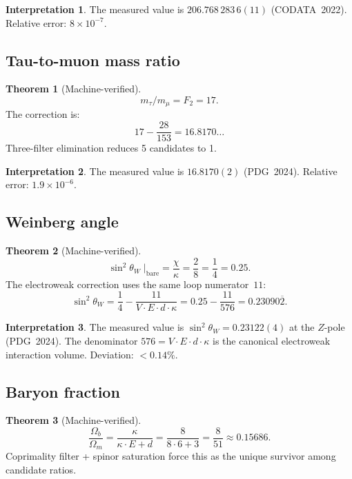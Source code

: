\documentclass[11pt,a4paper]{article}
\theoremstyle{definition}
\newtheorem{theorem}{Theorem}[section]
\newtheorem*{interpretation}{Interpretation}
\begin{document}
\begin{interpretation}
The measured value is $206.768\,283\,6(11)$ (CODATA~2022).
Relative error: $8 \times 10^{-7}$.
\end{interpretation}

\subsection{Tau-to-muon mass ratio}

\begin{theorem}[Machine-verified]
\[
  m_\tau / m_\mu = F_2 = 17.
\]
The correction is:
\[
  17 - \frac{28}{153} = 16.8170\ldots
\]
Three-filter elimination reduces 5 candidates to 1.
\end{theorem}

\begin{interpretation}
The measured value is $16.8170(2)$ (PDG~2024).
Relative error: $1.9 \times 10^{-6}$.
\end{interpretation}

\subsection{Weinberg angle}

\begin{theorem}[Machine-verified]
\[
  \sin^2 \theta_W \;\big|_{\mathrm{bare}} = \frac{\chi}{\kappa} = \frac{2}{8} = \frac{1}{4} = 0.25.
\]
The electroweak correction uses the same loop numerator~$11$:
\[
  \sin^2 \theta_W = \frac{1}{4} - \frac{11}{V \cdot E \cdot d \cdot \kappa}
  = 0.25 - \frac{11}{576} = 0.23090\overline{2}.
\]
\end{theorem}

\begin{interpretation}
The measured value is $\sin^2\theta_W = 0.23122(4)$ at the $Z$-pole
(PDG~2024).  The denominator $576 = V \cdot E \cdot d \cdot \kappa$
is the canonical electroweak interaction volume.
Deviation: $< 0.14\%$.
\end{interpretation}

\subsection{Baryon fraction}

\begin{theorem}[Machine-verified]
\[
  \frac{\Omega_b}{\Omega_m} = \frac{\kappa}{\kappa \cdot E + d}
  = \frac{8}{8 \cdot 6 + 3} = \frac{8}{51} \approx 0.15686.
\]
Coprimality filter + spinor saturation force this as the unique
survivor among candidate ratios.
\end{theorem}
\end{document}
